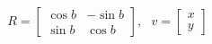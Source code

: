 \documentclass[12pt]{article}
\begin{document}
\[
    R = \begin{bmatrix}
        \cos b & -\sin b \\
        \sin b & \cos b
    \end{bmatrix}, \ \ \ v = \begin{bmatrix} x \\ y \end{bmatrix}
\]
\end{document}
